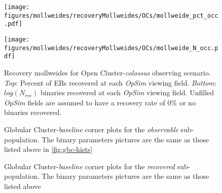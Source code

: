 \documentclass[twocolumn]{aastex63}
\begin{document}
\begin{figure}
    \centering
    \texttt{[image: figures/mollweides/recoveryMollweides/OCs/mollweide\_pct\_occ.pdf]}

    \texttt{[image: figures/mollweides/recoveryMollweides/OCs/mollweide\_N\_occ.pdf]}

    \caption{Recovery mollweides for Open Cluster-\textit{colossus} observing scenario. \textit{Top}: Percent of EBs recovered at each \textit{OpSim} viewing field. \textit{Bottom}: $log(N_{rec})$ binaries recovered at each \textit{OpSim} viewing field. Unfilled \textit{OpSim} fields are assumed to have a recovery rate of 0\% or no binaries recovered.}
    \label{fig:occ_recovery_mollweides}
\end{figure}


\begin{figure*}[p]
    \caption{Globular Cluster-\textit{baseline} corner plots for the \textit{observable} sub-population. The binary parameters pictures are the same as those listed above in \ref{fig:gbc-hists}} %
    \label{fig:gbc-Obs-corner-plot}
\end{figure*}

\begin{figure*}
    \caption{Globular Cluster-\textit{baseline} corner plots for the \textit{recovered} sub-population. The binary parameters pictures are the same as those listed above} %
    \label{fig:gbc-Rec-corner-plot}
\end{figure*}

\end{document}
